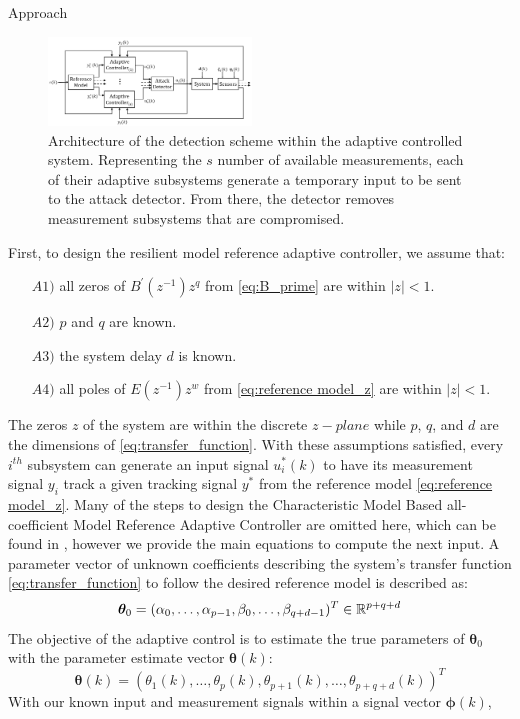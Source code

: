 \begin{section}{Approach}
\begin{figure}[ht!]
\vspace{1pt}
\centering
\includegraphics[width=0.48\textwidth]{con_and_det.png}
\caption{Architecture of the detection scheme within the adaptive controlled system. Representing  the $s$ number of available measurements, each of their adaptive subsystems generate a temporary input to be sent to the attack detector. From there, the detector removes measurement subsystems that are compromised.}
\label{fig:det_arch}
\end{figure}

First, to design the resilient model reference adaptive controller, we assume that:
	\begin{enumerate}[leftmargin=3\parindent]
	\item[$A1)$] all zeros of $B^{'}(z^{-1})z^q$ from \eqref{eq:B_prime} are within $|z|<1$. 
	\item[$A2)$] $p$ and $q$ are known. 
	\item[$A3)$] the system delay $d$ is known.
	\item[$A4)$] all poles of $E(z^{-1})z^w$ from \eqref{eq:reference model_z} are within $|z|<1$.
	\end{enumerate}
The zeros $z$ of the system are within the discrete $z-plane$ while $p$, $q$, and $d$ are the dimensions of \eqref{eq:transfer_function}. With these assumptions satisfied, every $i^{th}$ subsystem can generate an input signal $u^*_i(k)$ to have its measurement signal $y_i$ track a given tracking signal $y^*$ from the reference model \eqref{eq:reference model_z}. Many of the steps to design the Characteristic Model Based all-coefficient Model Reference Adaptive Controller are omitted here, which can be found in \cite{tao2003adaptive,Goodwin1643720}, however we provide the main equations to compute the next input. A parameter vector of unknown coefficients describing the system's transfer function \eqref{eq:transfer_function} to follow the desired reference model is described as:
    \begin{equation}
	\bm{\theta}_0=(\alpha_0, \dots ,\alpha_{p-1},\beta_0, \dots ,\beta_{q+d-1})^T \in \mathbb{R}^{p+q+d}
	\end{equation}
The objective of the adaptive control is to estimate the true parameters of $\bm{\theta}_0$ with the parameter estimate vector $\bm{\theta}(k)$:
    \begin{equation}
    \bm{\theta}(k)=(\theta_1(k), \dots ,\theta_p(k),\theta_{p+1}(k), \dots ,\theta_{p+q+d}(k))^T
	\end{equation}
With our known input and measurement signals within a signal vector $\bm{\phi}(k)$,
    

\end{section}
